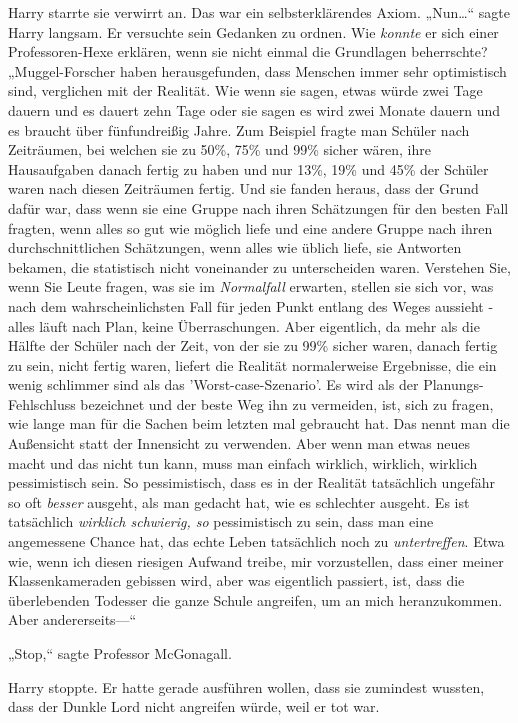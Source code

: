 {Harry starrte sie verwirrt an. Das war ein selbsterklärendes Axiom. „Nun…“ sagte Harry langsam. Er versuchte sein Gedanken zu ordnen. Wie \emph{konnte} er sich einer Professoren-Hexe erklären, wenn sie nicht einmal die Grundlagen beherrschte? „Muggel-Forscher haben herausgefunden, dass Menschen immer sehr optimistisch sind, verglichen mit der Realität. Wie wenn sie sagen, etwas würde zwei Tage dauern und es dauert zehn Tage oder sie sagen es wird zwei Monate dauern und es braucht über fünfundreißig Jahre. Zum Beispiel fragte man Schüler nach Zeiträumen, bei welchen sie zu 50\%, 75\% und 99\% sicher wären, ihre Hausaufgaben danach fertig zu haben und nur 13\%, 19\% und 45\% der Schüler waren nach diesen Zeiträumen fertig. Und sie fanden heraus, dass der Grund dafür war, dass wenn sie eine Gruppe nach ihren Schätzungen für den besten Fall fragten, wenn alles so gut wie möglich liefe und eine andere Gruppe nach ihren durchschnittlichen Schätzungen, wenn alles wie üblich liefe, sie Antworten bekamen, die statistisch nicht voneinander zu unterscheiden waren. Verstehen Sie, wenn Sie Leute fragen, was sie im \emph{Normalfall} erwarten, stellen sie sich vor, was nach dem wahrscheinlichsten Fall für jeden Punkt entlang des Weges aussieht - alles läuft nach Plan, keine Überraschungen. Aber eigentlich, da mehr als die Hälfte der Schüler nach der Zeit, von der sie zu 99\% sicher waren, danach fertig zu sein, nicht fertig waren, liefert die Realität normalerweise Ergebnisse, die ein wenig schlimmer sind als das 'Worst-case-Szenario'. Es wird als der Planungs-Fehlschluss bezeichnet und der beste Weg ihn zu vermeiden, ist, sich zu fragen, wie lange man für die Sachen beim letzten mal gebraucht hat. Das nennt man die Außensicht statt der Innensicht zu verwenden. Aber wenn man etwas neues macht und das nicht tun kann, muss man einfach wirklich, wirklich, wirklich pessimistisch sein. So pessimistisch, dass es in der Realität tatsächlich ungefähr so oft \emph{besser} ausgeht, als man gedacht hat, wie es schlechter ausgeht. Es ist tatsächlich \emph{wirklich schwierig, so} pessimistisch zu sein, dass man eine angemessene Chance hat, das echte Leben tatsächlich noch zu \emph{untertreffen}. Etwa wie, wenn ich diesen riesigen Aufwand treibe, mir vorzustellen, dass einer meiner Klassenkameraden gebissen wird, aber was eigentlich passiert, ist, dass die überlebenden Todesser die ganze Schule angreifen, um an mich heranzukommen. Aber andererseits—“

„Stop,“ sagte Professor McGonagall.

Harry stoppte. Er hatte gerade ausführen wollen, dass sie zumindest wussten, dass der Dunkle Lord nicht angreifen würde, weil er tot war.

}
